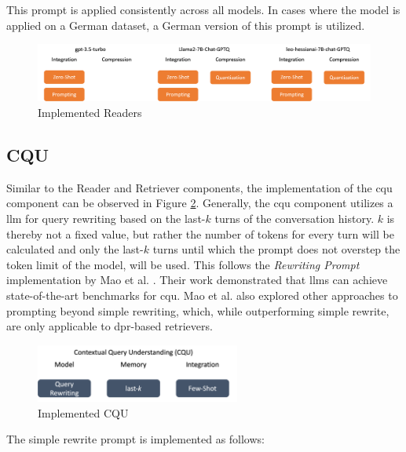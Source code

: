 This prompt is applied consistently across all models. In cases where the model is applied on a German dataset, a German version of this prompt is utilized.


\begin{figure}
    \centering
    \includegraphics[width=\textwidth]{Grafiken/Evaluation/reader_implemented.png}
    \caption{Implemented Readers}
    \label{fig:reader-implementation}
\end{figure}

\subsection{CQU}
\label{subsec:cqu-impl}

Similar to the Reader and Retriever components, the implementation of the \gls{cqu} component can be observed in Figure \ref{fig:cqu-implementation}. Generally, the \gls{cqu} component utilizes a \gls{llm} for query rewriting based on the last-$k$ turns of the conversation history. $k$ is thereby not a fixed value, but rather the number of tokens for every turn will be calculated and only the last-$k$ turns until which the prompt does not overstep the token limit of the model, will be used. This follows the \textit{Rewriting Prompt} implementation by Mao et al. \cite{mao_large_2023}. Their work demonstrated that \gls{llm}s can achieve state-of-the-art benchmarks for \gls{cqu}. Mao et al. also explored other approaches to prompting beyond simple rewriting, which, while outperforming simple rewrite, are only applicable to \gls{dpr}-based retrievers.

\begin{figure}[H]
    \centering
    \includegraphics[width=0.6\textwidth]{Grafiken/CQU_Implementation.png}
    \caption{Implemented CQU}
    \label{fig:cqu-implementation}
\end{figure}

The simple rewrite prompt is implemented as follows:

